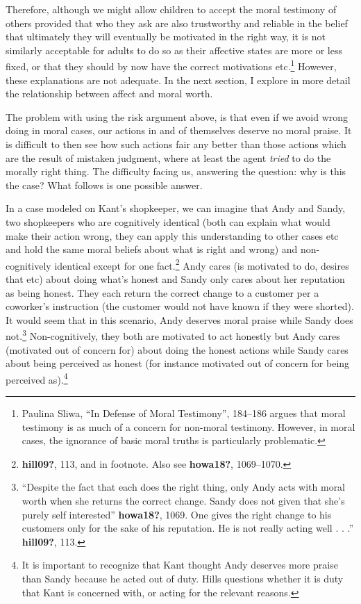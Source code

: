 \documentclass[
  12pt,
]{book}
\theoremstyle{definition}
\theoremstyle{definition}
\theoremstyle{definition}
\theoremstyle{definition}
\theoremstyle{remark}
\begin{document}
Therefore, although we might allow children to accept the moral testimony of others provided that who they ask are also trustworthy and reliable in the belief that ultimately they will eventually be motivated in the right way, it is not similarly acceptable for adults to do so as their affective states are more or less fixed, or that they should by now have the correct motivations etc.\footnote{Paulina Sliwa, {``In Defense of Moral Testimony''}, 184--186 argues that moral testimony is as much of a concern for non-moral testimony. However, in moral cases, the ignorance of basic moral truths is particularly problematic.} However, these explanations are not adequate. In the next section, I explore in more detail the relationship between affect and moral worth.

The problem with using the risk argument above, is that even if we avoid wrong doing in moral cases, our actions in and of themselves deserve no moral praise. It is difficult to then see how such actions fair any better than those actions which are the result of mistaken judgment, where at least the agent \emph{tried} to do the morally right thing. The difficulty facing us, answering the question: why is this the case? What follows is one possible answer.

In a case modeled on Kant's shopkeeper, we can imagine that Andy and Sandy, two shopkeepers who are cognitively identical (both can explain what would make their action wrong, they can apply this understanding to other cases etc and hold the same moral beliefs about what is right and wrong) and non-cognitively identical except for one fact.\footnote{\textbf{hill09?}, 113, and in footnote. Also see \textbf{howa18?}, 1069--1070.} Andy cares (is motivated to do, desires that etc) about doing what's honest and Sandy only cares about her reputation as being honest. They each return the correct change to a customer per a coworker's instruction (the customer would not have known if they were shorted). It would seem that in this scenario, Andy deserves moral praise while Sandy does not.\footnote{``Despite the fact that each does the right thing, only Andy acts with moral worth when she returns the correct change. Sandy does not given that she's purely self interested'' \textbf{howa18?}, 1069. One gives the right change to his customers only for the sake of his reputation. He is not really acting well . . .'' \textbf{hill09?}, 113.} Non-cognitively, they both are motivated to act honestly but Andy cares (motivated out of concern for) about doing the honest actions while Sandy cares about being perceived as honest (for instance motivated out of concern for being perceived as).\footnote{It is important to recognize that Kant thought Andy deserves more praise than Sandy because he acted out of duty. Hills questions whether it is duty that Kant is concerned with, or acting for the relevant reasons.}
\end{document}
